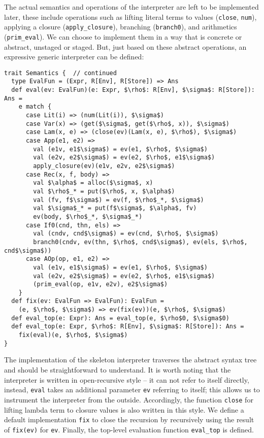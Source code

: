 The actual semantics and operations of the interpreter are left to be
implemented later, these include operations such as lifting literal terms to
values (\texttt{close}, \texttt{num}), applying a closure
(\texttt{apply\_closure}), branching (\texttt{branch0}), and arithmetics
(\texttt{prim\_eval}). We can choose to implement them in a way that is concrete
or abstract, unstaged or staged. But, just based on these abstract operations,
an expressive generic interpreter can be defined:

\begin{lstlisting}
trait Semantics {  // continued
  type EvalFun = (Expr, R[Env], R[Store]) => Ans
  def eval(ev: EvalFun)(e: Expr, $\rho$: R[Env], $\sigma$: R[Store]): Ans = 
    e match {
      case Lit(i) => (num(Lit(i)), $\sigma$)
      case Var(x) => (get($\sigma$, get($\rho$, x)), $\sigma$)
      case Lam(x, e) => (close(ev)(Lam(x, e), $\rho$), $\sigma$)
      case App(e1, e2) =>
        val (e1v, e1$\sigma$) = ev(e1, $\rho$, $\sigma$)
        val (e2v, e2$\sigma$) = ev(e2, $\rho$, e1$\sigma$)
        apply_closure(ev)(e1v, e2v, e2$\sigma$)
      case Rec(x, f, body) =>
        val $\alpha$ = alloc($\sigma$, x)
        val $\rho$_* = put($\rho$, x, $\alpha$)
        val (fv, f$\sigma$) = ev(f, $\rho$_*, $\sigma$)
        val $\sigma$_* = put(f$\sigma$, $\alpha$, fv)
        ev(body, $\rho$_*, $\sigma$_*)
      case If0(cnd, thn, els) =>
        val (cndv, cnd$\sigma$) = ev(cnd, $\rho$, $\sigma$)
        branch0(cndv, ev(thn, $\rho$, cnd$\sigma$), ev(els, $\rho$, cnd$\sigma$))
      case AOp(op, e1, e2) =>
        val (e1v, e1$\sigma$) = ev(e1, $\rho$, $\sigma$)
        val (e2v, e2$\sigma$) = ev(e2, $\rho$, e1$\sigma$)
        (prim_eval(op, e1v, e2v), e2$\sigma$)
    }
  def fix(ev: EvalFun => EvalFun): EvalFun = 
    (e, $\rho$, $\sigma$) => ev(fix(ev))(e, $\rho$, $\sigma$)
  def eval_top(e: Expr): Ans = eval_top(e, $\rho$0, $\sigma$0)
  def eval_top(e: Expr, $\rho$: R[Env], $\sigma$: R[Store]): Ans = 
    fix(eval)(e, $\rho$, $\sigma$)
}
\end{lstlisting}

The implementation of the skeleton interpreter traverses the abstract syntax
tree and should be straightforward to understand. It is worth noting that the
interpreter is written in open-recursive style -- it can not refer to itself
directly, instead, \texttt{eval} takes an additional parameter \texttt{ev}
referring to itself; this allows us to instrument the interpreter from the
outside. Accordingly, the function \texttt{close} for lifting lambda term to
closure values is also written in this style. We define a default implementation
\texttt{fix} to close the recursion by recursively using the result of
\texttt{fix(ev)} for \texttt{ev}. Finally, the top-level evaluation function
\texttt{eval\_top} is defined.

